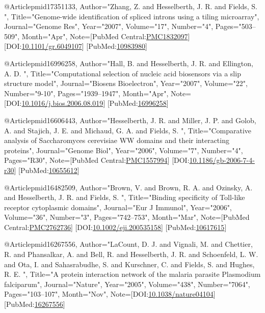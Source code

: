 @Article{pmid17351133,
   Author="Zhang, Z.  and Hesselberth, J. R.  and Fields, S. ",
   Title="{{G}enome-wide identification of spliced introns using a tiling microarray}",
   Journal="Genome Res",
   Year="2007",
   Volume="17",
   Number="4",
   Pages="503--509",
   Month="Apr",
   Note={[PubMed Central:\href{https://www.ncbi.nlm.nih.gov/pmc/articles/PMC1832097}{PMC1832097}] [DOI:\href{https://dx.doi.org/10.1101/gr.6049107}{10.1101/gr.6049107}] [PubMed:\href{https://www.ncbi.nlm.nih.gov/pubmed/10983980}{10983980}] }
}

@Article{pmid16996258,
   Author="Hall, B.  and Hesselberth, J. R.  and Ellington, A. D. ",
   Title="{{C}omputational selection of nucleic acid biosensors via a slip structure model}",
   Journal="Biosens Bioelectron",
   Year="2007",
   Volume="22",
   Number="9-10",
   Pages="1939--1947",
   Month="Apr",
   Note={[DOI:\href{https://dx.doi.org/10.1016/j.bios.2006.08.019}{10.1016/j.bios.2006.08.019}] [PubMed:\href{https://www.ncbi.nlm.nih.gov/pubmed/16996258}{16996258}] }
}

@Article{pmid16606443,
   Author="Hesselberth, J. R.  and Miller, J. P.  and Golob, A.  and Stajich, J. E.  and Michaud, G. A.  and Fields, S. ",
   Title="{{C}omparative analysis of {S}accharomyces cerevisiae {W}{W} domains and their interacting proteins}",
   Journal="Genome Biol",
   Year="2006",
   Volume="7",
   Number="4",
   Pages="R30",
   Note={[PubMed Central:\href{https://www.ncbi.nlm.nih.gov/pmc/articles/PMC1557994}{PMC1557994}] [DOI:\href{https://dx.doi.org/10.1186/gb-2006-7-4-r30}{10.1186/gb-2006-7-4-r30}] [PubMed:\href{https://www.ncbi.nlm.nih.gov/pubmed/10655612}{10655612}] }
}

@Article{pmid16482509,
   Author="Brown, V.  and Brown, R. A.  and Ozinsky, A.  and Hesselberth, J. R.  and Fields, S. ",
   Title="{{B}inding specificity of {T}oll-like receptor cytoplasmic domains}",
   Journal="Eur J Immunol",
   Year="2006",
   Volume="36",
   Number="3",
   Pages="742--753",
   Month="Mar",
   Note={[PubMed Central:\href{https://www.ncbi.nlm.nih.gov/pmc/articles/PMC2762736}{PMC2762736}] [DOI:\href{https://dx.doi.org/10.1002/eji.200535158}{10.1002/eji.200535158}] [PubMed:\href{https://www.ncbi.nlm.nih.gov/pubmed/10617615}{10617615}] }
}

@Article{pmid16267556,
   Author="LaCount, D. J.  and Vignali, M.  and Chettier, R.  and Phansalkar, A.  and Bell, R.  and Hesselberth, J. R.  and Schoenfeld, L. W.  and Ota, I.  and Sahasrabudhe, S.  and Kurschner, C.  and Fields, S.  and Hughes, R. E. ",
   Title="{{A} protein interaction network of the malaria parasite {P}lasmodium falciparum}",
   Journal="Nature",
   Year="2005",
   Volume="438",
   Number="7064",
   Pages="103--107",
   Month="Nov",
   Note={[DOI:\href{https://dx.doi.org/10.1038/nature04104}{10.1038/nature04104}] [PubMed:\href{https://www.ncbi.nlm.nih.gov/pubmed/16267556}{16267556}] }
}

